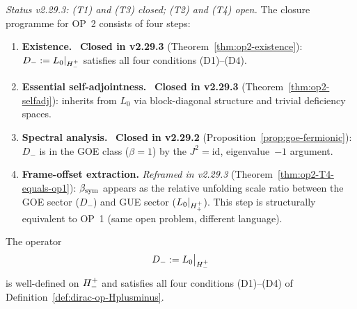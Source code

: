 \begin{proposition}
\label{prop:op2-targets}
\emph{Status v2.29.3: (T1) and (T3) closed; (T2) and (T4) open.}
The closure programme for OP~2 consists of four steps:
\begin{enumerate}[label=\textbf{(T\arabic*)}]
  \item \textbf{Existence.} \checkmark\ \textbf{Closed in v2.29.3}
    (Theorem~\ref{thm:op2-existence}): $D_{-} := L_0|_{H^+_-}$
    satisfies all four conditions (D1)--(D4).
  \item \textbf{Essential self-adjointness.} \checkmark\ \textbf{Closed in
    v2.29.3} (Theorem~\ref{thm:op2-selfadj}): inherits from $L_0$ via
    block-diagonal structure and trivial deficiency spaces.
  \item \textbf{Spectral analysis.} \checkmark\ \textbf{Closed in
    v2.29.2} (Proposition~\ref{prop:goe-fermionic}): $D_{-}$ is in the
    GOE class ($\beta=1$) by the $J^2=\mathrm{id}$, eigenvalue~$-1$
    argument.
  \item \textbf{Frame-offset extraction.} \emph{Reframed in v2.29.3}
    (Theorem~\ref{thm:op2-T4-equals-op1}): $\beta_{\mathrm{sym}}$ appears as the
    relative unfolding scale ratio between the GOE sector ($D_{-}$)
    and GUE sector ($L_0|_{H^+_+}$). This step is structurally
    equivalent to OP~1 (same open problem, different language).
\end{enumerate}
\end{proposition}

\begin{theorem}[OP~2 (T1): Existence of $D_{-}$]
\label{thm:op2-existence}
The operator
\[
  D_{-} := L_0\big|_{H^+_-}
\]
is well-defined on $H^+_-$ and satisfies all four conditions
(D1)--(D4) of Definition~\ref{def:dirac-op-Hplusminus}.
\end{theorem}


